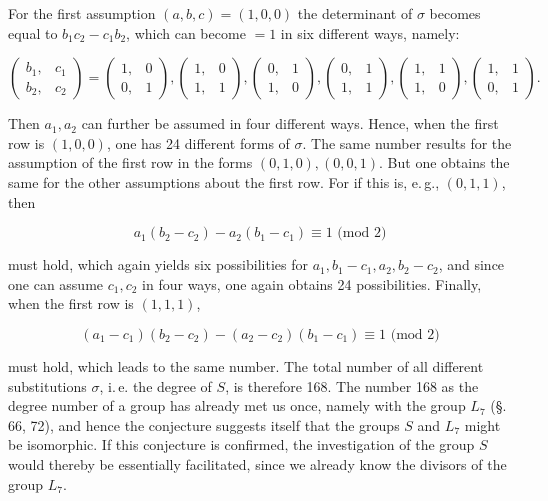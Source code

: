 
For the first assumption $(a, b, c) = (1, 0, 0)$ the determinant
of $\sigma$ becomes equal to $b_1 c_2 - c_1 b_2$, which can become $= 1$ in six
different ways, namely:

\[
\begin{pmatrix} b_1, & c_1 \\ b_2, & c_2 \end{pmatrix} = \begin{pmatrix} 1, & 0 \\ 0, & 1 \end{pmatrix}, \begin{pmatrix} 1, & 0 \\ 1, & 1 \end{pmatrix}, \begin{pmatrix} 0, & 1 \\ 1, & 0 \end{pmatrix}, \begin{pmatrix} 0, & 1 \\ 1, & 1 \end{pmatrix}, \begin{pmatrix} 1, & 1 \\ 1, & 0 \end{pmatrix}, \begin{pmatrix} 1, & 1 \\ 0, & 1 \end{pmatrix}.
\]

Then $a_1, a_2$ can further be assumed in four different
ways. Hence, when the first row is $(1, 0, 0)$,
one has 24 different forms of $\sigma$. The same number results
for the assumption of the first row in the forms $(0, 1, 0), (0, 0, 1)$.
But one obtains the same for the other assumptions
about the first row. For if this is, e.\,g., $(0, 1, 1)$, then

\[
a_1 (b_2 - c_2) - a_2 (b_1 - c_1) \equiv 1 \text{ (mod 2)}
\]

must hold, which again yields six possibilities for $a_1, b_1 - c_1, a_2, b_2 - c_2$,
and since one can assume $c_1, c_2$ in four ways, one
again obtains 24 possibilities. Finally, when the
first row is $(1, 1, 1)$,

\[
(a_1 - c_1)(b_2 - c_2) - (a_2 - c_2)(b_1 - c_1) \equiv 1 \text{ (mod 2)}
\]

must hold, which leads to the same number. The total number of all different
substitutions $\sigma$, i.\,e. the degree of $S$, is therefore 168.
The number 168 as the degree number of a group has already
met us once, namely with the group $L_7$ (\S.\,66, 72), and hence
the conjecture suggests itself that the groups $S$ and $L_7$
might be isomorphic. If this conjecture is confirmed,
the investigation of the group $S$ would thereby be essentially
facilitated, since we already know the divisors of the
group $L_7$.

